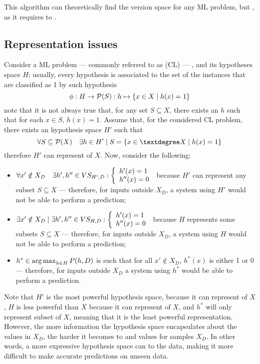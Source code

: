 \documentclass[a4paper, 12pt]{report}
\begin{document}
    This algorithm can theoretically find the version space for any ML problem, but , as it requires to .

    \subsection{Representation issues}

    Consider a  ML problem --- commonly referred to as  (CL) --- , and its hypotheses space $H$; usually, every hypothesis is associated to the set of the instances that are classified as 1 by such hypothesis $$\funcmap{\phi}{H}{\powerset(S)}{h}{\{x \in X \mid h(x) = 1\}}$$ note that it is not always true that, for any set $S \subseteq X$, there exists an $h$ such that for each $x \in S$, $h(x) = 1$. Assume that, for the considered CL problem, there exists an hypothesis space $H'$ such that $$\forall S \subseteq \powerset(X) \quad \exists h \in H' \mid S = \{x \in °X \mid h(x)  = 1\}$$ therefore $H'$ can represent  of $X$. Now, consider the following:

    \begin{itemize}
        \item $\forall x' \notin X_D \quad \exists h', h'' \in VS_{H', D} : \soe{l}{h'(x) = 1 \\ h''(x) = 0}$ because $H'$ can represent any subset $S \subseteq X$ --- therefore, for  inputs outside $X_D$, a system using $H'$ would not be able to perform a prediction;
        \item $\exists x' \notin X_D \mid \exists h', h'' \in VS_{H, D} : \soe{l}{h'(x) = 1 \\ h''(x) = 0}$ because $H$ represents some subsets $S \subseteq X$ ---  therefore, for  inputs outside $X_D$, a system using $H$ would not be able to perform a prediction;
        \item $h^* \in \argmax_{h \in H}{P(h, D)}$ is such that for all $x' \notin X_D$, $h^*(x)$ is either 1 or 0 --- therefore, for  inputs outside $X_D$ a system using $h^*$ would be able to perform a prediction.
    \end{itemize}

    Note that $H'$ is the most powerful hypothesis space, because it can represent  of $X$, $H$ is less powerful than $X$ because it can represent  of $X$, and $h^*$ will only represent  subset of $X$, meaning that it is the least powerful representation. However, the more information the hypothesis space encapsulates about the values in $X_D$, the harder it becomes to  and  values for samples  $X_D$. In other words, a more expressive hypothesis space can  to the data, making it more difficult to make accurate predictions on unseen data.
    
\end{document}
